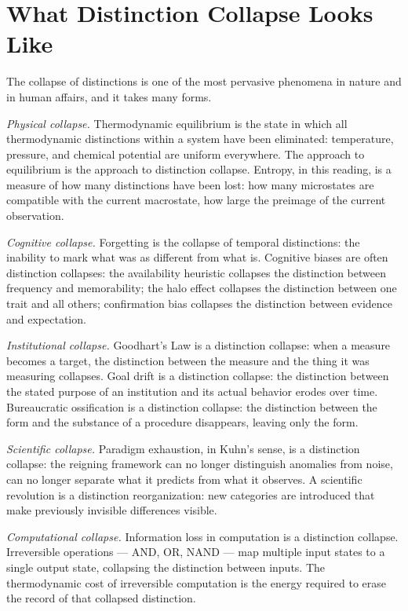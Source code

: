 \documentclass[12pt,a4paper]{book}
\theoremstyle{remark}
\theoremstyle{definition}
\begin{document}
\section{What Distinction Collapse Looks Like}

The collapse of distinctions is one of the most pervasive phenomena in
nature and in human affairs, and it takes many forms.

\textit{Physical collapse.} Thermodynamic equilibrium is the state in
which all thermodynamic distinctions within a system have been eliminated:
temperature, pressure, and chemical potential are uniform everywhere.
The approach to equilibrium is the approach to distinction collapse.
Entropy, in this reading, is a measure of how many distinctions have
been lost: how many microstates are compatible with the current macrostate,
how large the preimage of the current observation.

\textit{Cognitive collapse.} Forgetting is the collapse of temporal
distinctions: the inability to mark what was as different from what is.
Cognitive biases are often distinction collapses: the availability
heuristic collapses the distinction between frequency and memorability;
the halo effect collapses the distinction between one trait and all
others; confirmation bias collapses the distinction between evidence and
expectation.

\textit{Institutional collapse.} Goodhart's Law is a distinction collapse:
when a measure becomes a target, the distinction between the measure and
the thing it was measuring collapses. Goal drift is a distinction collapse:
the distinction between the stated purpose of an institution and its
actual behavior erodes over time. Bureaucratic ossification is a
distinction collapse: the distinction between the form and the substance
of a procedure disappears, leaving only the form.

\textit{Scientific collapse.} Paradigm exhaustion, in Kuhn's sense, is
a distinction collapse: the reigning framework can no longer distinguish
anomalies from noise, can no longer separate what it predicts from what
it observes. A scientific revolution is a distinction reorganization:
new categories are introduced that make previously invisible differences
visible.

\textit{Computational collapse.} Information loss in computation is a
distinction collapse. Irreversible operations --- AND, OR, NAND --- map
multiple input states to a single output state, collapsing the distinction
between inputs. The thermodynamic cost of irreversible computation is
the energy required to erase the record of that collapsed distinction.
\end{document}
